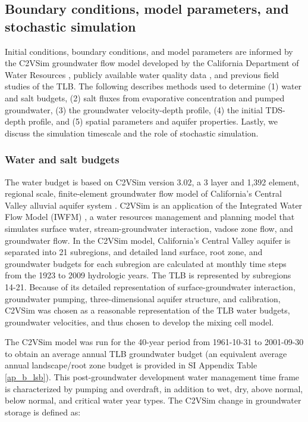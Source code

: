 %
%
\subsection{Boundary conditions, model parameters, and stochastic simulation}
\label{ss_2_4}

Initial conditions, boundary conditions, and model parameters are informed by the C2VSim groundwater flow model developed by the California Department of Water Resources \citep{Brush2013}, publicly available water quality data \citep{CSWRCB}, and previous field studies of the TLB. The following describes methods used to determine (1) water and salt budgets, (2) salt fluxes from evaporative concentration and pumped groundwater, (3) the groundwater velocity-depth profile, (4) the initial TDS-depth profile, and (5) spatial parameters and aquifer properties. Lastly, we discuss the simulation timescale and the role of stochastic simulation.

%
%
\subsubsection{Water and salt budgets}
\label{ss_2_5}

The water budget is based on C2VSim version 3.02, a 3 layer and 1,392 element, regional scale, finite-element groundwater flow model of California's Central Valley alluvial aquifer system \citep{Brush2013}. C2VSim is an application of the Integrated Water Flow Model (IWFM) \citep{Dogrul2018}, a water resources management and planning model that simulates surface water, stream-groundwater interaction, vadose zone flow, and groundwater flow. In the C2VSim model, California's Central Valley aquifer is separated into 21 subregions, and detailed land surface, root zone, and groundwater budgets for each subregion are calculated at monthly time steps from the 1923 to 2009 hydrologic years. The TLB is represented by subregions 14-21. Because of its detailed representation of surface-groundwater interaction, groundwater pumping, three-dimensional aquifer structure, and calibration, C2VSim was chosen as a reasonable representation of the TLB water budgets, groundwater velocities, and thus chosen to develop the mixing cell model. 

The C2VSim model was run for the 40-year period from 1961-10-31 to 2001-09-30 to obtain an average annual TLB groundwater budget (an equivalent average annual landscape/root zone budget is provided in SI Appendix Table \ref{ap_b_lsb}). This post-groundwater development water management time frame is characterized by pumping and overdraft, in addition to wet, dry, above normal, below normal, and critical water year types. The C2VSim change in groundwater storage is defined as:

